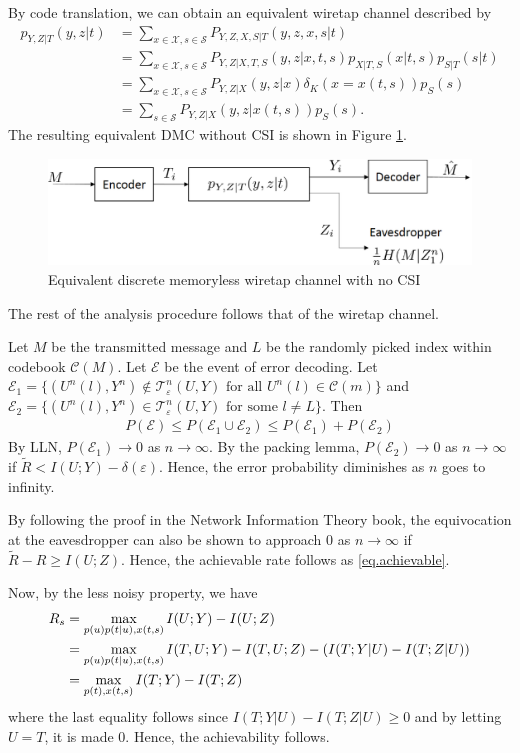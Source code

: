 \documentclass[12pt, Draft, onecolumn]{IEEEtran}
\def\calC{{\mathcal{C}}}
\def\calE{{\mathcal{E}}}
\def\calS{{\mathcal{S}}}
\def\calX{{\mathcal{X}}}
\def\calT{{\mathcal{T}}}
\begin{document}
 By code translation, we can obtain an equivalent wiretap channel described by
\begin{align*}
p_{Y,Z|T}(y,z|t) &= \sum_{x\in\calX, s\in\calS}P_{Y,Z,X,S|T}(y,z,x,s|t)\\
&= \sum_{x\in\calX, s\in\calS}P_{Y,Z|X,T,S}(y,z|x,t,s)p_{X|T,S}(x|t,s)p_{S|T}(s|t)\\
&= \sum_{x\in\calX, s\in\calS}P_{Y,Z|X}(y,z|x)\delta_K(x=x(t,s))p_{S}(s)\\
&= \sum_{s\in\calS}P_{Y,Z|X}(y,z|x(t,s))p_{S}(s).
\end{align*}
The resulting equivalent DMC without CSI is shown in Figure \ref{fig.secrecy_noCSIR_channel_equivalent}.
\begin{figure}[h]
\centering
\includegraphics[scale=.6]{figs/secrecy_noCSIR_channel_equivalent}
\caption{Equivalent discrete memoryless wiretap channel with no CSI}
\label{fig.secrecy_noCSIR_channel_equivalent}
\end{figure}
The rest of the analysis procedure follows that of the wiretap channel.

Let $M$ be the transmitted message and $L$ be the randomly picked index within codebook $\calC(M)$. Let $\calE$ be the event of error decoding. Let $\calE_1=\{(U^n(l), Y^n)\notin\calT^n_{\varepsilon}(U,Y) \text{ for all $U^n(l)\in \calC(m)$}\}$ and $\calE_2=\{(U^n(l), Y^n)\in\calT^n_{\varepsilon}(U,Y) \text{ for some $l\neq L$}\}$. Then
\begin{align*}
P(\calE)\leq P(\calE_1\cup\calE_2) \leq P(\calE_1)+P(\calE_2)
\end{align*}
By LLN, $P(\calE_1)\rightarrow 0$ as $n\rightarrow \infty$. By the packing lemma, $P(\calE_2)\rightarrow 0$ as $n\rightarrow \infty$ if $\tilde{R}<I(U;Y)-\delta(\varepsilon)$. Hence, the error probability diminishes as $n$ goes to infinity.

By following the proof in the Network Information Theory book, the equivocation at the eavesdropper can also be shown to approach $0$ as $n\rightarrow \infty$ if $\tilde{R}-R\geq I(U;Z)$. Hence, the achievable rate follows as \eqref{eq.achievable}.

Now, by the less noisy property, we have
\begin{align}
R_s &= \max_{p(u)p(t|u),x(t,s)} I(U;Y)-I(U;Z)\notag\\
&= \max_{p(u)p(t|u),x(t,s)} I(T,U;Y)-I(T,U;Z)-(I(T;Y|U)-I(T;Z|U))\notag\\
&= \max_{p(t),x(t,s)} I(T;Y)-I(T;Z)
\end{align}
where the last equality follows since $I(T;Y|U)-I(T;Z|U)\geq 0$ and by letting $U=T$, it is made $0$. Hence, the achievability follows.
\end{document}
